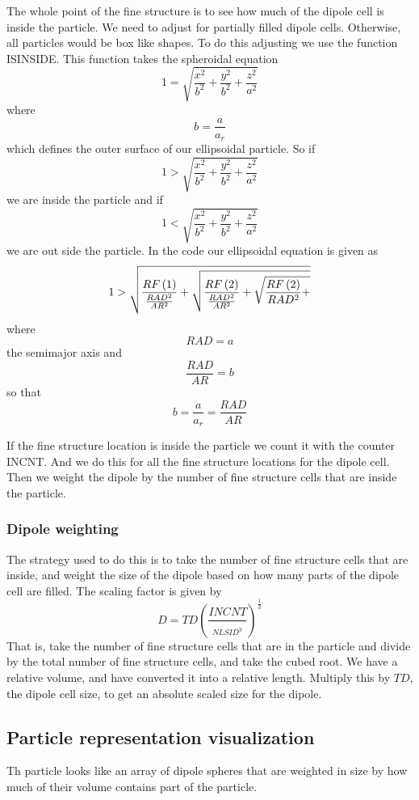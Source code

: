 \documentclass{article}
\begin{document}
The whole point of the fine structure is to see how much of the dipole cell
is inside the particle. We need to adjust for partially filled dipole cells.
Otherwise, all particles would be box like shapes. To do this adjusting we
use the function ISINSIDE. This function takes the spheroidal equation%
\[
1=\sqrt{\frac{x^{2}}{b^{2}}+\frac{y^{2}}{b^{2}}+\frac{z^{2}}{a^{2}}} 
\]%
where%
\[
b=\frac{a}{a_{r}} 
\]%
which defines the outer surface of our ellipsoidal particle. So if 
\[
1>\sqrt{\frac{x^{2}}{b^{2}}+\frac{y^{2}}{b^{2}}+\frac{z^{2}}{a^{2}}} 
\]%
we are inside the particle and if 
\[
1<\sqrt{\frac{x^{2}}{b^{2}}+\frac{y^{2}}{b^{2}}+\frac{z^{2}}{a^{2}}} 
\]%
we are out side the particle. In the code our ellipsoidal equation is given
as 
\[
1>\sqrt{\frac{RF\left( 1\right) }{\frac{RAD^{2}}{AR^{2}}}+\sqrt{\frac{%
RF\left( 2\right) }{\frac{RAD^{2}}{AR^{2}}}+\sqrt{\frac{RF\left( 2\right) }{%
RAD^{2}}+}}} 
\]%
where 
\[
RAD=a 
\]%
the semimajor axis and 
\[
\frac{RAD}{AR}=b 
\]%
so that 
\[
b=\frac{a}{a_{r}}=\frac{RAD}{AR} 
\]

If the fine structure location is inside the particle we count it with the
counter INCNT. And we do this for all the fine structure locations for the
dipole cell. Then we weight the dipole by the number of fine structure cells
that are inside the particle.

\subsubsection{Dipole weighting}

The strategy used to do this is to take the number of fine structure cells
that are inside, and weight the size of the dipole based on how many parts
of the dipole cell are filled. The scaling factor is given by 
\[
D=TD\left( \frac{INCNT}{_{NLSID^{3}}}\right) ^{\frac{1}{3}}
\]%
That is, take the number of fine structure cells that are in the particle
and divide by the total number of fine structure cells, and take the cubed
root. We have a relative volume, and have converted it into a relative
length. Multiply this by $TD$, the dipole cell size, to get an absolute
scaled size for the dipole.

\subsection{Particle representation visualization }

Th particle looks like an array of dipole spheres that are weighted in size
by how much of their volume contains part of the particle. 
\end{document}
